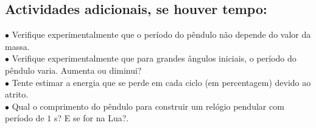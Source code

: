 \documentclass[a4paper,twoside,12pt]{article}      %
\begin{document}
\subsection{\sf Actividades adicionais, se houver tempo:}

 \begin{flushleft}
	 $\bullet$ Verifique experimentalmente que o período do pêndulo não depende do valor da massa.\\
	 $\bullet$ Verifique experimentalmente que para grandes ângulos iniciais, o período do pêndulo varia. Aumenta ou diminui?\\
	 $\bullet$ Tente estimar a energia que se perde em cada ciclo (em percentagem) devido ao atrito.\\
	 $\bullet$ Qual o comprimento do pêndulo para construir um relógio pendular com período de $1$ s? 
	 E se for na Lua?.
\end{flushleft} 

 
\end{document}
